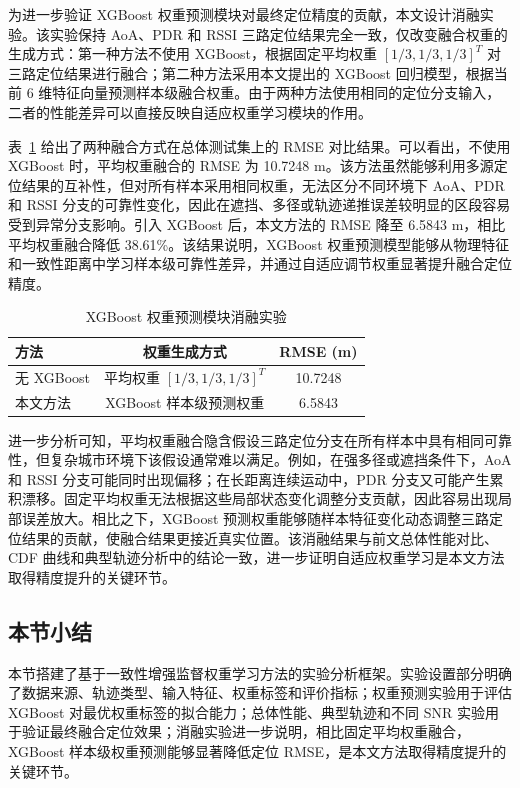 为进一步验证 XGBoost 权重预测模块对最终定位精度的贡献，本文设计消融实验。该实验保持 AoA、PDR 和 RSSI 三路定位结果完全一致，仅改变融合权重的生成方式：第一种方法不使用 XGBoost，根据固定平均权重 \([1/3,1/3,1/3]^T\) 对三路定位结果进行融合；第二种方法采用本文提出的 XGBoost 回归模型，根据当前 6 维特征向量预测样本级融合权重。由于两种方法使用相同的定位分支输入，二者的性能差异可以直接反映自适应权重学习模块的作用。

表~\ref{tab:ch3_ablation_xgb} 给出了两种融合方式在总体测试集上的 RMSE 对比结果。可以看出，不使用 XGBoost 时，平均权重融合的 RMSE 为 10.7248 m。该方法虽然能够利用多源定位结果的互补性，但对所有样本采用相同权重，无法区分不同环境下 AoA、PDR 和 RSSI 分支的可靠性变化，因此在遮挡、多径或轨迹递推误差较明显的区段容易受到异常分支影响。引入 XGBoost 后，本文方法的 RMSE 降至 6.5843 m，相比平均权重融合降低 38.61\%。该结果说明，XGBoost 权重预测模型能够从物理特征和一致性距离中学习样本级可靠性差异，并通过自适应调节权重显著提升融合定位精度。

\begin{table}[htbp]
    \centering
    \caption{XGBoost 权重预测模块消融实验}
    \label{tab:ch3_ablation_xgb}
    \begin{tabular}{lcc}
        \toprule
        \textbf{方法} & \textbf{权重生成方式} & \textbf{RMSE (m)} \\
        \midrule
        无 XGBoost & 平均权重 \([1/3,1/3,1/3]^T\) & 10.7248 \\
        本文方法 & XGBoost 样本级预测权重 & 6.5843 \\
        \bottomrule
    \end{tabular}
\end{table}

进一步分析可知，平均权重融合隐含假设三路定位分支在所有样本中具有相同可靠性，但复杂城市环境下该假设通常难以满足。例如，在强多径或遮挡条件下，AoA 和 RSSI 分支可能同时出现偏移；在长距离连续运动中，PDR 分支又可能产生累积漂移。固定平均权重无法根据这些局部状态变化调整分支贡献，因此容易出现局部误差放大。相比之下，XGBoost 预测权重能够随样本特征变化动态调整三路定位结果的贡献，使融合结果更接近真实位置。该消融结果与前文总体性能对比、CDF 曲线和典型轨迹分析中的结论一致，进一步证明自适应权重学习是本文方法取得精度提升的关键环节。

\subsection{本节小结}
\label{subsec:3_6_8}

本节搭建了基于一致性增强监督权重学习方法的实验分析框架。实验设置部分明确了数据来源、轨迹类型、输入特征、权重标签和评价指标；权重预测实验用于评估 XGBoost 对最优权重标签的拟合能力；总体性能、典型轨迹和不同 SNR 实验用于验证最终融合定位效果；消融实验进一步说明，相比固定平均权重融合，XGBoost 样本级权重预测能够显著降低定位 RMSE，是本文方法取得精度提升的关键环节。

